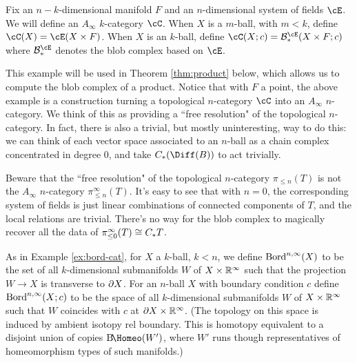 \begin{example}
\rm
\label{ex:blob-complexes-of-balls}
Fix an $n{-}k$-dimensional manifold $F$ and an $n$-dimensional system of fields $\cE$.
We will define an $A_\infty$ $k$-category $\cC$.
When $X$ is a $m$-ball, with $m<k$, define $\cC(X) = \cE(X\times F)$.
When $X$ is an $k$-ball,
define $\cC(X; c) = \bc^\cE_*(X\times F; c)$
where $\bc^\cE_*$ denotes the blob complex based on $\cE$.
\end{example}

This example will be used in Theorem \ref{thm:product} below, which allows us to compute the blob complex of a product.
Notice that with $F$ a point, the above example is a construction turning a topological 
$n$-category $\cC$ into an $A_\infty$ $n$-category.
We think of this as providing a ``free resolution" 
of the topological $n$-category. 
In fact, there is also a trivial, but mostly uninteresting, way to do this: 
we can think of each vector space associated to an $n$-ball as a chain complex concentrated in degree $0$, 
and take $\CD{B}$ to act trivially. 

Beware that the ``free resolution" of the topological $n$-category $\pi_{\leq n}(T)$ 
is not the $A_\infty$ $n$-category $\pi^\infty_{\leq n}(T)$.
It's easy to see that with $n=0$, the corresponding system of fields is just 
linear combinations of connected components of $T$, and the local relations are trivial.
There's no way for the blob complex to magically recover all the data of $\pi^\infty_{\leq 0}(T) \cong C_* T$.

\begin{example}
\rm
\label{ex:bordism-category-ainf}
As in Example \ref{ex:bord-cat}, for $X$ a $k$-ball, $k<n$, we define $\operatorname{Bord}^{n,\infty}(X)$
to be the set of all $k$-dimensional
submanifolds $W$ of $X\times \mathbb R^\infty$ such that the projection $W \to X$ is transverse
to $\partial X$.
For an $n$-ball $X$ with boundary condition $c$ 
define $\operatorname{Bord}^{n,\infty}(X; c)$ to be the space of all $k$-dimensional
submanifolds $W$ of $X\times \mathbb R^\infty$ such that 
$W$ coincides with $c$ at $\partial X \times \mathbb R^\infty$.
(The topology on this space is induced by ambient isotopy rel boundary.
This is homotopy equivalent to a disjoint union of copies $\mathrm{B}\!\Homeo(W')$, where
$W'$ runs though representatives of homeomorphism types of such manifolds.)
\end{example}



